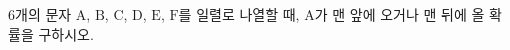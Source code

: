 $6$개의 문자 $\mathrm{A}$, $\mathrm{B}$, $\mathrm{C}$, $\mathrm{D}$, $\mathrm{E}$, $\mathrm{F}$를 일렬로 나열할 때, $\mathrm{A}$가 맨 앞에 오거나 맨 뒤에 올 확률을 구하시오.
